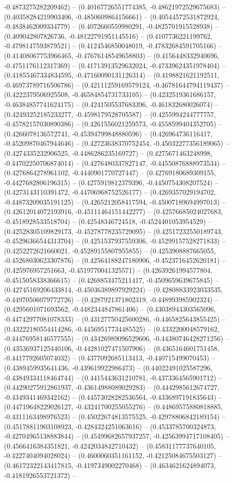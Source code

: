 -0.4873275282209462) -- (0.40167726551774385, -0.48621972529675683) -- (0.40358284219903406, -0.4850609864156661) -- (0.40544572531872924, -0.4838462009334779) -- (0.4072660559980291, -0.4825701915528938) -- (0.409042807826736, -0.48122791951145516) -- (0.4107736221199762, -0.4798147593879521) -- (0.4124546850048019, -0.47832684591705166) -- (0.41408067753966465, -0.47676148549658803) -- (0.4156448332940696, -0.4751176112317369) -- (0.41713913529632024, -0.47339624351978404) -- (0.41855467334834595, -0.47160090131126314) -- (0.4198821621192511, -0.46973789716506786) -- (0.42111259169579124, -0.46781644794119437) -- (0.4222379506925508, -0.46584854731733105) -- (0.4232519361686157, -0.46384857741624175) -- (0.4241505537683396, -0.461832680026074) -- (0.42493252185233277, -0.4598179528705587) -- (0.4255994244777757, -0.45782157030890386) -- (0.4261556021259573, -0.4558599404352705) -- (0.4266078136572741, -0.45394799848880596) -- (0.426964736116417, -0.45209870467944646) -- (0.42723638370752454, -0.45032277356189065) -- (0.4274335232906525, -0.4486286235169727) -- (0.4275671463248998, -0.44702250706874014) -- (0.4276480337827147, -0.44550876888973534) -- (0.4276864278961102, -0.4440901770727447) -- (0.42769180689309155, -0.4427682806196315) -- (0.4275919812379396, -0.4450754308207524) -- (0.4273143110391472, -0.44706968752526177) -- (0.4269357029194702, -0.44873209035191125) -- (0.4265212058417594, -0.45007189694997013) -- (0.42612014072193916, -0.45111464151442277) -- (0.42576685024027683, -0.4518928533518704) -- (0.42548346724518, -0.4524401053954529) -- (0.42528305109829173, -0.45278778235729095) -- (0.42517232550189743, -0.45296366544313704) -- (0.4251537937559306, -0.45299157528271833) -- (0.4252272621660021, -0.45289155807955855) -- (0.4253908887665055, -0.45268030623307876) -- (0.42564188247180906, -0.4523716452620181) -- (0.425976957251663, -0.4519770041325571) -- (0.42639261994577804, -0.4515058338366615) -- (0.4268853475211417, -0.4509659639675845) -- (0.42745169206433814, -0.45036389897929224) -- (0.42808833923033535, -0.44970506079772726) -- (0.4287921371802319, -0.448993985902324) -- (0.4295601071693562, -0.4482344847861406) -- (0.43038944303565096, -0.44742977081078333) -- (0.43127750425600286, -0.4465825643855425) -- (0.43222180554414286, -0.44569517734485525) -- (0.4332200048579162, -0.44476958146577555) -- (0.43426989096529606, -0.44380746428271256) -- (0.43536937125440106, -0.44281027471507906) -- (0.4365164601751458, -0.4417792605074032) -- (0.4377092685113413, -0.440715499070453) -- (0.4389459935641436, -0.439619922986473) -- (0.44022491025587296, -0.43849334118464744) -- (0.4415443631210781, -0.4373364565901712) -- (0.44290275912861937, -0.43614988089029283) -- (0.4442985612674727, -0.4349341469342162) -- (0.44573028282536564, -0.4336897191835643) -- (0.44719648229026127, -0.43241700255055276) -- (0.44869575880818885, -0.4311163498976523) -- (0.45022674813575525, -0.42978806842189154) -- (0.45178811903108923, -0.4284324251063616) -- (0.4533785700324873, -0.42704965138883844) -- (0.45499682657937257, -0.42563994717108405) -- (0.4566416384351821, -0.4242034842710432) -- (0.45831177737640105, -0.4227404094028024) -- (0.4600060351161152, -0.42125084675503127) -- (0.46172322143417815, -0.4197349002270468) -- (0.4634621624894073, -0.4181926553721372) -- 